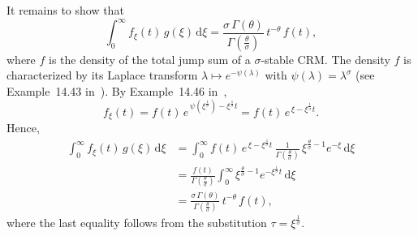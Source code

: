 It remains to show that
\[
\int_0^\infty f_{\xi}(t)\, g(\xi)\,\mathrm{d}\xi = \frac{\sigma\,\Gamma(\theta)}{\Gamma\!\left(\frac{\theta}{\sigma}\right)}\,t^{-\theta}\,f(t),
\]
where $f$ is the density of the total jump sum of a $\sigma$-stable CRM. The density $f$ is characterized by its Laplace transform $\lambda \mapsto e^{-\psi(\lambda)}$ with $\psi(\lambda) = \lambda^\sigma$ (see Example~14.43 in~\cite{ghosal2017fundamentals}). By Example~14.46 in~\cite{ghosal2017fundamentals},
\[
f_{\xi}(t) = f(t)\,e^{\,\psi\!\left(\xi^{\frac{1}{\sigma}}\right) - \xi^{\frac{1}{\sigma}}t} = f(t)\,e^{\,\xi - \xi^{\frac{1}{\sigma}}t}.
\]
Hence,
\begin{align*}
    \int_0^\infty f_{\xi}(t)\, g(\xi)\,\mathrm{d}\xi
    &= \int_0^\infty f(t)\,e^{\,\xi - \xi^{\frac{1}{\sigma}}t}\, \frac{1}{\Gamma\!\left(\frac{\theta}{\sigma}\right)}\,\xi^{\frac{\theta}{\sigma}-1}e^{-\xi}\,\mathrm{d}\xi \\
    &= \frac{f(t)}{\Gamma\!\left(\frac{\theta}{\sigma}\right)} \int_0^\infty \xi^{\frac{\theta}{\sigma}-1}e^{-\xi^{\frac{1}{\sigma}}t}\,\mathrm{d}\xi \\
    &= \frac{\sigma\,\Gamma(\theta)}{\Gamma\!\left(\frac{\theta}{\sigma}\right)}\,t^{-\theta}\,f(t),
\end{align*}
where the last equality follows from the substitution $\tau = \xi^{\frac{1}{\sigma}}$.








